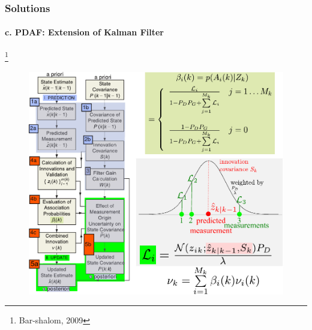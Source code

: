 \documentclass{beamer}
\begin{document}
\begin{frame}
\frametitle{Solutions}
\framesubtitle{c. PDAF: Extension of Kalman Filter}
\footnote{ \tiny Bar-shalom, 2009}
\mypagenum	
\begin{figure}
\includegraphics[height=0.7\textheight]{figs/TRK_PDAF_flowDiagram.pdf}
\end{figure}	
\end{frame}
\end{document}
